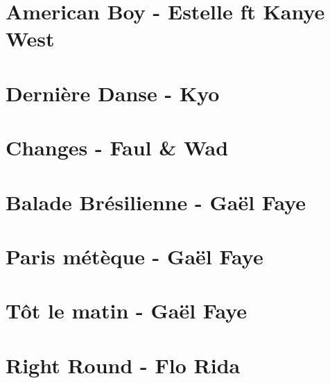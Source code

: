 \documentclass{guitartabs}
\begin{document}
\section{American Boy - Estelle ft Kanye West}
\begin{guitar}

\end{guitar}

\section{Dernière Danse - Kyo}
\begin{guitar}

\end{guitar}


\section{Changes - Faul \& Wad}
\begin{guitar}

\end{guitar}

\section{Balade Brésilienne - Gaël Faye}
\begin{guitar}

\end{guitar}


\section{Paris métèque - Gaël Faye}
\begin{guitar}

\end{guitar}


\section{Tôt le matin - Gaël Faye}
\begin{guitar}

\end{guitar}

\section{Right Round - Flo Rida}
\begin{guitar}

\end{guitar}
\end{document}
